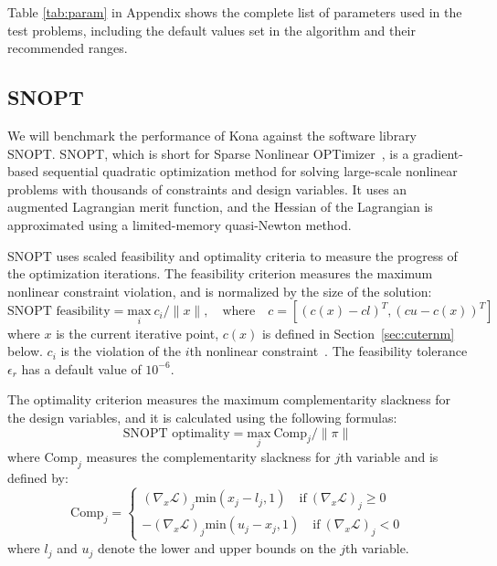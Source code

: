 Table \ref{tab:param} in Appendix shows the complete list of parameters used in the test problems, including
the default values set in the algorithm and their recommended ranges.



\subsection{SNOPT}
We will benchmark the performance of Kona against the software library SNOPT.
SNOPT, which is short for Sparse Nonlinear OPTimizer~\cite{gill:2002}, is a gradient-based sequential 
quadratic optimization method for solving large-scale nonlinear problems 
with thousands of constraints and design variables. It uses an augmented Lagrangian 
merit function, and the Hessian of the Lagrangian is approximated
using a limited-memory quasi-Newton method. 

SNOPT uses scaled feasibility and optimality criteria 
 to measure the progress of the 
optimization iterations. The feasibility criterion measures the maximum nonlinear constraint violation, 
and is normalized by the size of the solution:
\begin{equation*}
\text{SNOPT feasibility} = \underset{i}{\text{max}}  \  c_i / \lVert x \rVert, \quad \text{where} \quad c= \left[ ( c(x) - cl)^T, (cu -c(x) )^T \right]   
\end{equation*}        
where $x$ is the current iterative point, $c(x)$ is defined in Section~\ref{sec:cuternm} below. 
$c_i$ is the violation of the $i$th nonlinear constraint~\cite{snopt_manual}. The feasibility tolerance 
$\epsilon_r$ has a default value of $10^{-6}$.

The optimality criterion measures the maximum complementarity slackness for the design variables, 
and it is calculated using the following formulas:
\begin{equation*}
\text{SNOPT optimality} = \underset{j}{\text{max}}  \ \text{Comp}_j / \lVert \pi \rVert 
\end{equation*}
where $\text{Comp}_j$ measures the complementarity slackness for $j$th variable and is defined by:
\begin{equation*}
\text{Comp}_j = \begin{cases}
(\nabla_x \mathcal{L})_j \text{min} (x_j - l_j, 1)  \quad \text{if} \ (\nabla_x \mathcal{L})_j \geq 0 \\
-(\nabla_x \mathcal{L})_j \text{min} (u_j - x_j, 1) \quad \text{if} \ (\nabla_x \mathcal{L})_j < 0
\end{cases}
\end{equation*}
where $l_j$ and $u_j$ denote the lower and upper bounds on the $j$th variable. 

